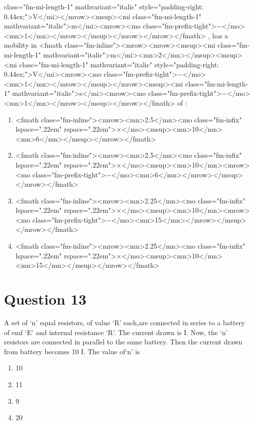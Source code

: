 \documentclass{article}
\begin{document}
class="fm-mi-length-1" mathvariant="italic" style="padding-right: 0.44ex;">V</mi></mrow><msup><mi class="fm-mi-length-1" mathvariant="italic">m</mi><mrow><mo class="fm-prefix-tight">−</mo><mn>1</mn></mrow></msup></mrow></mrow></fmath> , has a mobility in <fmath class="fm-inline"><mrow><mrow><msup><mi class="fm-mi-length-1" mathvariant="italic">m</mi><mn>2</mn></msup><msup><mi class="fm-mi-length-1" mathvariant="italic" style="padding-right: 0.44ex;">V</mi><mrow><mo class="fm-prefix-tight">−</mo><mn>1</mn></mrow></msup></mrow><msup><mi class="fm-mi-length-1" mathvariant="italic">s</mi><mrow><mo class="fm-prefix-tight">−</mo><mn>1</mn></mrow></msup></mrow></fmath> of :  
\begin{enumerate}[label=(\alph*)]
\item  <fmath class="fm-inline"><mrow><mn>2.5</mn><mo class="fm-infix" lspace=".22em" rspace=".22em">×</mo><msup><mn>10</mn><mn>6</mn></msup></mrow></fmath> 
\item  <fmath class="fm-inline"><mrow><mn>2.5</mn><mo class="fm-infix" lspace=".22em" rspace=".22em">×</mo><msup><mn>10</mn><mrow><mo class="fm-prefix-tight">−</mo><mn>6</mn></mrow></msup></mrow></fmath> 
\item  <fmath class="fm-inline"><mrow><mn>2.25</mn><mo class="fm-infix" lspace=".22em" rspace=".22em">×</mo><msup><mn>10</mn><mrow><mo class="fm-prefix-tight">−</mo><mn>15</mn></mrow></msup></mrow></fmath> 
\item  <fmath class="fm-inline"><mrow><mn>2.25</mn><mo class="fm-infix" lspace=".22em" rspace=".22em">×</mo><msup><mn>10</mn><mn>15</mn></msup></mrow></fmath> 
\end{enumerate}
\newpage
\section*{Question 13}
A set of ‘n’ equal resistors, of value ‘R’ each,are connected in series to a battery of emf ‘E’ and internal resistance ‘R’. The current drawn is I. Now, the ‘n’ resistors are connected in parallel to the same battery. Then the current drawn from battery becomes 10 I. The value of‘n’ is 
\begin{enumerate}[label=(\alph*)]
\item 10
\item 11
\item 9
\item 20
\end{enumerate}
\newpage
\end{document}
